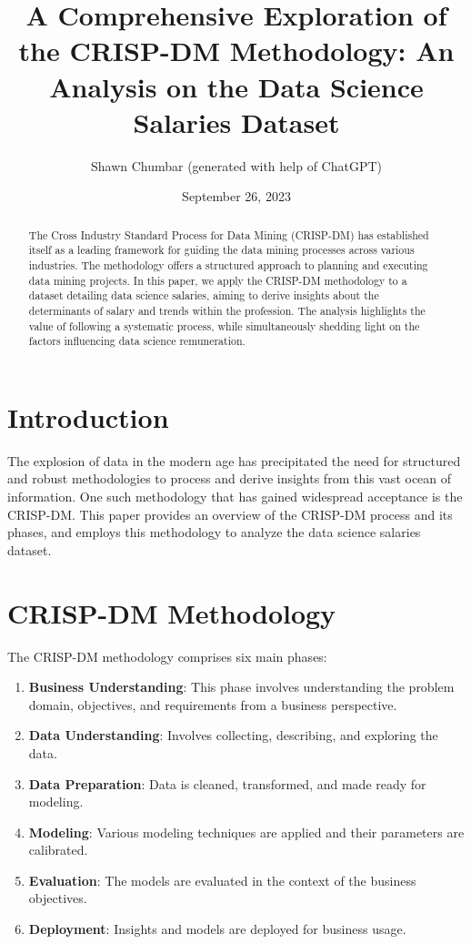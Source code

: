 \documentclass[12pt]{article}
\title{A Comprehensive Exploration of the CRISP-DM Methodology: An Analysis on the Data Science Salaries Dataset}
\author{Shawn Chumbar (generated with help of ChatGPT)}
\date{September 26, 2023}
\begin{document}
\maketitle

\begin{abstract}
The Cross Industry Standard Process for Data Mining (CRISP-DM) has established itself as a leading framework for guiding the data mining processes across various industries. The methodology offers a structured approach to planning and executing data mining projects. In this paper, we apply the CRISP-DM methodology to a dataset detailing data science salaries, aiming to derive insights about the determinants of salary and trends within the profession. The analysis highlights the value of following a systematic process, while simultaneously shedding light on the factors influencing data science remuneration.
\end{abstract}

\section{Introduction}
The explosion of data in the modern age has precipitated the need for structured and robust methodologies to process and derive insights from this vast ocean of information. One such methodology that has gained widespread acceptance is the CRISP-DM. This paper provides an overview of the CRISP-DM process and its phases, and employs this methodology to analyze the data science salaries dataset.

\section{CRISP-DM Methodology}
The CRISP-DM methodology comprises six main phases:

\begin{enumerate}
    \item \textbf{Business Understanding}: This phase involves understanding the problem domain, objectives, and requirements from a business perspective.
    \item \textbf{Data Understanding}: Involves collecting, describing, and exploring the data.
    \item \textbf{Data Preparation}: Data is cleaned, transformed, and made ready for modeling.
    \item \textbf{Modeling}: Various modeling techniques are applied and their parameters are calibrated.
    \item \textbf{Evaluation}: The models are evaluated in the context of the business objectives.
    \item \textbf{Deployment}: Insights and models are deployed for business usage.
\end{enumerate}
\end{document}
